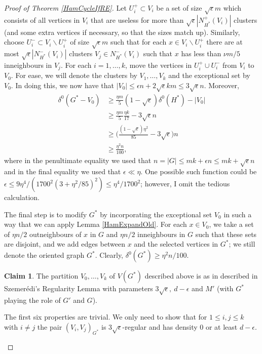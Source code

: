 \documentclass[10pt,letterpaper, reqno]{amsart}
\theoremstyle{definition}
\numberwithin{equation}{section}
\newtheorem{claim}{Claim}
\begin{document}
\begin{proof}[Proof of Theorem \ref{HamCycleIfRE}]
	\noindent Let $U_i^+ \subset V_i$ be a set of size $\sqrt{\epsilon}m$ which consists of all vertices in $V_i$ that are useless for more than $\sqrt{\epsilon}|N_{H^*}^+(V_i)|$ clusters (and some extra vertices if necessary, so that the sizes match up). Similarly, choose $U_i^- \subset V_i \backslash U_i^+$ of size $\sqrt{\epsilon}m$ such that for each $x \in  V_i \backslash U_i^+$ there are at most $\sqrt{\epsilon}|N^-_{H^*}(V_i)|$ clusters $V_j \in N^-_{H^*}(V_i)$ such that $x$ has less than $\nu m/5$ inneighbours in $V_j$.  For each $i=1, \dots, k$, move the vertices in $U_i^+ \cup U_i^-$ from $V_i$ to $V_0$. For ease, we will denote the clusters by $V_1, \dots, V_k$ and the exceptional set by $V_0$. In doing this, we now have that $|V_0| \leq \epsilon n + 2\sqrt{\epsilon} k m \leq 3\sqrt{\epsilon}n$. Moreover, 
	\begin{align*}
		\delta^0(G^*-V_0) &\geq \frac{\eta m}{5}(1-\sqrt{\epsilon})\delta^0(H^*) - |V_0|  \\ &\geq \frac{\eta m}{5} \frac{\eta k}{17} - 3\sqrt{\epsilon}n \\
		& \geq \Big(\frac{(1-\sqrt{\epsilon})\eta^2}{85} - 3\sqrt{\epsilon}\Big) n
		\\
		& \geq \frac{\eta^2 n}{100},	
	\end{align*} 
	where in the penultimate equality we used that $n = |G| \leq mk + \epsilon n \leq mk + \sqrt{\epsilon}n$ and in the final equality we used that $\epsilon \ll \eta$. One possible such function could be $\epsilon \leq 9\eta^4/(1700^2(3+\eta^2/85)^2) \leq \eta^4/1700^2$; however, I omit the tedious calculation. 
	
	The final step is to modify $G^*$ by incorporating the exceptional set $V_0$ in such a way that we can apply Lemma \ref{HamExpandOld}. For each $x \in V_0$, we take a set of $\eta n/2$ outneighbours of $x$ in $G$ and $\eta n/2$ inneighbours in $G$ such that these sets are disjoint, and we add edges between $x$ and the selected vertices in $G^*$; we still denote the oriented graph $G^*$. Clearly, $\delta^0(G^*) \geq \eta^2 n/100$.
	
	\begin{claim}
		The partition $V_0, \dots, V_k$ of $V(G^*)$ described above is as in described in Szemer\'{e}di's Regularity Lemma with parameters 3$\sqrt{\epsilon}, \ d-\epsilon$ and $M'$ (with $G^*$ playing the role of $G'$ and $G$).
	\end{claim}
	
	\begin{adjustwidth}{2.5em}{0pt}
		The first six properties are trivial. We only need to show that for $1\leq i,j \leq k$ with $i\neq j$ the pair $(V_i,V_j)_{G^*}$ is $3\sqrt{\epsilon}$-regular and has density 0 or at least $d-\epsilon$.
		

\end{adjustwidth}
\end{proof}
\end{document}
